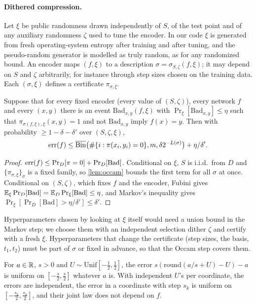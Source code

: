 \paragraph{Dithered compression.} Let $\xi$ be public randomness drawn independently of $S$, of the test point and of any auxiliary randomness $\zeta$ used to tune the encoder. In our code $\xi$ is generated from fresh operating-system entropy after training and after tuning, and the pseudo-random generator is modelled as truly random, as for any randomized bound. An encoder maps $(f,\xi)$ to a description $\sigma=\sigma_{S,\zeta}(f,\xi)$; it may depend on $S$ and $\zeta$ arbitrarily, for instance through step sizes chosen on the training data. Each $(\sigma,\xi)$ defines a certificate $\pi_{\sigma,\xi}$.

\begin{theorem}\label{thm:dither}
Suppose that for every fixed encoder (every value of $(S,\zeta)$), every network $f$ and every $(x,y)$ there is an event $\mathrm{Bad}_{x,y}(f,\xi)$ with $\Pr_\xi[\mathrm{Bad}_{x,y}]\le\eta$ such that $\pi_{\sigma(f,\xi),\xi}(x,y)=1$ and not $\mathrm{Bad}_{x,y}$ imply $f(x)=y$. Then with probability $\ge1-\delta-\delta'$ over $(S,\zeta,\xi)$,
\[
\mathrm{err}(f)\le\overline{\mathrm{Bin}}\big(\#\{i:\pi(x_i,y_i)=0\},m,\delta2^{-L(\sigma)}\big)+\eta/\delta'.
\]
\end{theorem}
\begin{proof}
$\mathrm{err}(f)\le\Pr_D[\pi=0]+\Pr_D[\mathrm{Bad}]$. Conditional on $\xi$, $S$ is i.i.d.\ from $D$ and $\{\pi_{\sigma,\xi}\}_\sigma$ is a fixed family, so \cref{lem:occam} bounds the first term for all $\sigma$ at once. Conditional on $(S,\zeta)$, which fixes $f$ and the encoder, Fubini gives $\mathbb{E}_\xi\Pr_D[\mathrm{Bad}]=\mathbb{E}_D\Pr_\xi[\mathrm{Bad}]\le\eta$, and Markov's inequality gives $\Pr_\xi[\Pr_D[\mathrm{Bad}]>\eta/\delta']\le\delta'$.
\end{proof}
Hyperparameters chosen by looking at $\xi$ itself would need a union bound in the Markov step; we choose them with an independent selection dither $\zeta$ and certify with a fresh $\xi$. Hyperparameters that change the certificate (step sizes, the basis, $t_1,t_2$) must be part of $\sigma$ or fixed in advance, so that the Occam step covers them.

\begin{lemma}\label{lem:dither}
For $a\in\mathbb{R}$, $s>0$ and $U\sim\mathrm{Unif}[-\frac12,\frac12]$, the error $s(\mathrm{round}(a/s+U)-U)-a$ is uniform on $[-\frac s2,\frac s2]$ whatever $a$ is. With independent $U$'s per coordinate, the errors are independent, the error in a coordinate with step $s_k$ is uniform on $[-\frac{s_k}2,\frac{s_k}2]$, and their joint law does not depend on $f$.
\end{lemma}

